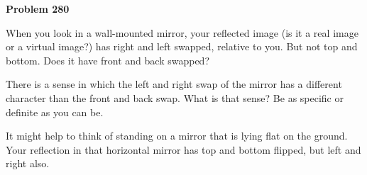 \documentclass[12pt]{article}
\begin{document}
\begin{pottproblem}
\textbf{Problem 280}

When you look in a wall-mounted mirror, your reflected image (is it a
real image or a virtual image?) has right and left swapped, relative
to you. But not top and bottom. Does it have front and back swapped?

There is a sense in which the left and right swap of the mirror has a
different character than the front and back swap. What is that sense?
Be as specific or definite as you can be.

It might help to think of standing on a mirror that is lying flat on
the ground. Your reflection in that horizontal mirror has top and
bottom flipped, but left and right also.

\end{pottproblem}
\end{document}
